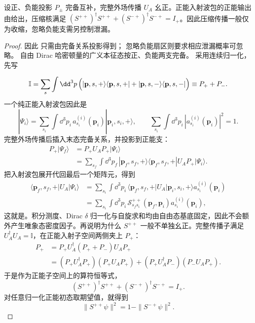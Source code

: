 \begin{proposition}[幺正传播的正能压缩与泄漏]
设正、负能投影 $P_\pm$ 完备互补，完整外场传播 $U_A$ 幺正。正能入射波包的正能输出由给出，压缩核满足 $(S^{++})^\dagger S^{++}+(S^{-+})^\dagger S^{-+}=I_+$。因此压缩传播一般仅为收缩，忽略负能支需另控制泄漏。
\end{proposition}
\begin{proof}
因此 只需由完备关系投影得到； 忽略负能扇区则要求相应泄漏概率可忽略。 自由 Dirac 哈密顿量的广义本征态按正、负能两支完备。 采用连续归一化，先写

\begin{equation*}
\mathbb I
=\sum_s\int\dd^3 p\,
\Bigl(
|\mathbf p,s,+\rangle\langle\mathbf p,s,+|
+|\mathbf p,s,-\rangle\langle\mathbf p,s,-|
\Bigr)
\equiv P_++P_-.
\end{equation*}
一个纯正能入射波包因此是
\begin{equation*}
|\Psi_i\rangle
=\sum_{s_i}\int\dd^3 p_i\,
 a^{(i)}_{s_i}(\mathbf p_i)|\mathbf p_i,s_i,+\rangle,
\qquad
\sum_{s_i}\int\dd^3 p_i\,
|a^{(i)}_{s_i}(\mathbf p_i)|^2=1.
\end{equation*}
完整外场传播后插入末态完备关系，并投影到正能支：
\begin{align*}
P_+|\Psi_f\rangle
&=P_+U_AP_+|\Psi_i\rangle\\
&=\sum_{s_f}\int\dd^3 p_f\,
|\mathbf p_f,s_f,+\rangle
\langle\mathbf p_f,s_f,+|U_AP_+|\Psi_i\rangle.
\end{align*}
把入射波包展开代回最后一个矩阵元，得到
\begin{align*}
\langle\mathbf p_f,s_f,+|U_A|\Psi_i\rangle
&=\sum_{s_i}\int\dd^3 p_i\,
\langle\mathbf p_f,s_f,+|U_A|\mathbf p_i,s_i,+\rangle
 a^{(i)}_{s_i}(\mathbf p_i)\\
&=\sum_{s_i}\int\dd^3 p_i\,
\mathcal S^{++}_{s_fs_i}(\mathbf p_f,\mathbf p_i)
 a^{(i)}_{s_i}(\mathbf p_i),
\end{align*}
这就是。积分测度、Dirac $\delta$ 归一化与自旋求和均由自由态基底固定，因此不会额外产生唯象态密度因子。再说明为什么 $S^{++}$ 一般不单独幺正。完整传播子满足 $U_A^\dagger U_A=\mathbb I$，在正能入射子空间两侧夹上 $P_+$：
\begin{align*}
P_+
&=P_+U_A^\dagger(P_++P_-)U_AP_+\\
&=(P_+U_A^\dagger P_+)(P_+U_AP_+)
 +(P_+U_A^\dagger P_-)(P_-U_AP_+).
\end{align*}
于是作为正能子空间上的算符恒等式，
\begin{equation*}
(S^{++})^\dagger S^{++}+(S^{-+})^\dagger S^{-+}=I_+.
\end{equation*}
对任意归一化正能初态取期望值，就得到
\begin{equation*}
\|S^{++}\psi\|^2
=1-\|S^{-+}\psi\|^2.
\end{equation*}
\end{proof}


